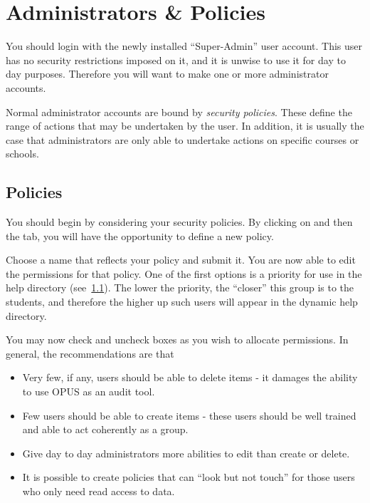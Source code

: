 \documentclass[12 pt]{book}
\begin{document}
\chapter{Administrators \& Policies}

You should login with the newly installed ``Super-Admin'' user account. This
user has no security restrictions imposed on it, and it is unwise to use it
for day to day purposes. Therefore you will want to make one or more administrator
accounts.

Normal administrator accounts are bound by \emph{security policies}. These define
the range of actions that may be undertaken by the user. In addition, it is usually
the case that administrators are only able to undertake actions on specific courses
or schools.

\section{Policies}

You should begin by considering your security policies. By clicking on
 and then the  tab,
you will have the opportunity to define a new policy.

Choose a name that reflects your policy and submit it. You are now able to
edit the permissions for that policy. One of the first options is a priority
for use in the help directory (see~\ref{}). The lower the priority, the 
``closer'' this group is to the students, and therefore the
higher up such users will appear in the dynamic help directory.

You may now check and uncheck boxes as you wish to allocate permissions. 
In general, the recommendations are that
\begin{itemize}
  \item Very few, if any, users should be able to delete items - it damages
    the ability to use OPUS as an audit tool.
  \item Few users should be able to create items - these users should be well
    trained and able to act coherently as a group.
  \item Give day to day administrators more abilities to edit than create or delete.
  \item It is possible to create policies that can ``look but not touch'' for those
    users who only need read access to data.
\end{itemize}
\end{document}
